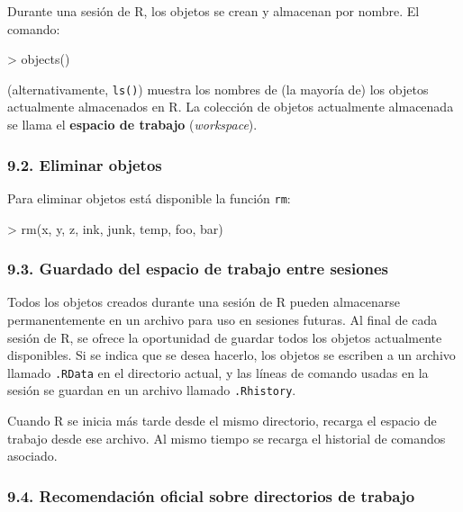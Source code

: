 \documentclass[
  jou,
  floatsintext,
  longtable,
  a4paper,
  nolmodern,
  notxfonts,
  notimes,
  12pt,
  colorlinks=true,linkcolor=blue,citecolor=blue,urlcolor=blue]{apa7}
\newenvironment{Shaded}{\begin{snugshade}}{\end{snugshade}}
\newcommand{\FunctionTok}[1]{\textcolor[rgb]{0.28,0.35,0.67}{#1}}
\newcommand{\NormalTok}[1]{\textcolor[rgb]{0.00,0.23,0.31}{#1}}
\newcommand{\SpecialCharTok}[1]{\textcolor[rgb]{0.37,0.37,0.37}{#1}}
\begin{document}
Durante una sesión de R, los objetos se crean y almacenan por nombre. El
comando:

\begin{Shaded}
\begin{Highlighting}[]
\SpecialCharTok{\textgreater{}} \FunctionTok{objects}\NormalTok{()}
\end{Highlighting}
\end{Shaded}

(alternativamente, \texttt{ls()}) muestra los nombres de (la mayoría de)
los objetos actualmente almacenados en R. La colección de objetos
actualmente almacenada se llama el \textbf{espacio de trabajo}
(\emph{workspace}).

\subsubsection{9.2. Eliminar objetos}\label{eliminar-objetos}

Para eliminar objetos está disponible la función \texttt{rm}:

\begin{Shaded}
\begin{Highlighting}[]
\SpecialCharTok{\textgreater{}} \FunctionTok{rm}\NormalTok{(x, y, z, ink, junk, temp, foo, bar)}
\end{Highlighting}
\end{Shaded}

\subsubsection{9.3. Guardado del espacio de trabajo entre
sesiones}\label{guardado-del-espacio-de-trabajo-entre-sesiones}

Todos los objetos creados durante una sesión de R pueden almacenarse
permanentemente en un archivo para uso en sesiones futuras. Al final de
cada sesión de R, se ofrece la oportunidad de guardar todos los objetos
actualmente disponibles. Si se indica que se desea hacerlo, los objetos
se escriben a un archivo llamado \texttt{.RData} en el directorio
actual, y las líneas de comando usadas en la sesión se guardan en un
archivo llamado \texttt{.Rhistory}.

Cuando R se inicia más tarde desde el mismo directorio, recarga el
espacio de trabajo desde ese archivo. Al mismo tiempo se recarga el
historial de comandos asociado.

\subsubsection{9.4. Recomendación oficial sobre directorios de
trabajo}\label{recomendaciuxf3n-oficial-sobre-directorios-de-trabajo}
\end{document}
